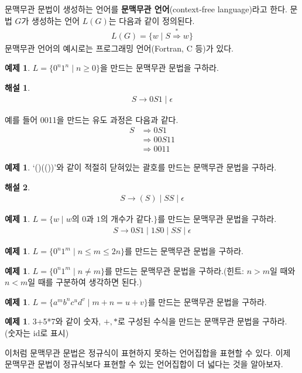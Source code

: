 \documentclass[b5paper, 11pt]{book}
\theoremstyle{definition}
\newtheorem{ex}[defn]{예제}
\newtheorem*{ans*}{해설}
\begin{document}
문맥무관 문법이 생성하는 언어를 \textbf{문맥무관 언어}(context-free language)라고 한다. 문법 $G$가 생성하는 언어 $L(G)$는 다음과 같이 정의된다.
\begin{align*}
    L(G) = \{ w \; \vert \; S \overset{*}{\Rightarrow} w \}
\end{align*}
문맥무관 언어의 예시로는 프로그래밍 언어(Fortran, C 등)가 있다. 
\begin{ex} \label{0n1n_CFG}
$L = \{ 0^n 1^n \; \vert \; n \ge 0\}$을 만드는 문맥무관 문법을 구하라.
\end{ex}
\begin{ans*}
    \begin{align*}
        S \rightarrow 0S1 \; \vert \; \epsilon 
    \end{align*}
\end{ans*}
예를 들어 0011을 만드는 유도 과정은 다음과 같다.
\begin{align*}
    S &\Rightarrow 0S1 \\
    &\Rightarrow 00S11 \\ 
    &\Rightarrow 0011
\end{align*}
\begin{ex}\label{bracket_CFG}
     `()(())'와 같이 적절히 닫혀있는 괄호를 만드는 문맥무관 문법을 구하라.
\end{ex} 
\begin{ans*}
    \begin{align*}
        S \rightarrow (S) \; \vert \; SS \; \vert \; \epsilon 
     \end{align*}
\end{ans*}
\begin{ex}\label{same0and1}
    $L = \{w \;\vert\; w\text{의 0과 1의 개수가 같다.}\}$를 만드는 문맥무관 문법을 구하라.
    \begin{align*}
        S \rightarrow 0S1 \;\vert\; 1S0 \;\vert\; SS \;\vert\; \epsilon
    \end{align*}
\end{ex}
\begin{ex} $L = \{ 0^n 1^m \; \vert \; n \le m \le 2n\}$를 만드는 문맥무관 문법을 구하라.
\end{ex}
\begin{ex} 
    $L = \{ 0^n 1^m \; \vert \; n \neq m\}$를 만드는 문맥무관 문법을 구하라.(힌트:     $n>m$일 때와 $n < m$일 때를 구분하여 생각하면 된다.)
\end{ex}
\begin{ex} $L = \{ a^m b^n c^u d^v \;\vert\; m+n = u+v\}$를 만드는 문맥무관 문법을 구하라.
\end{ex}
\begin{ex} \label{3+5*7}
    3+5*7와 같이 숫자, $+, *$로 구성된 수식을 만드는 문맥무관 문법을 구하라. (숫자는 id로 표시)
\end{ex}
이처럼 문맥무관 문법은 정규식이 표현하지 못하는 언어집합을 표현할 수 있다.
이제 문맥무관 문법이 정규식보다 표현할 수 있는 언어집합이 더 넓다는 것을 알아보자.
\end{document}
